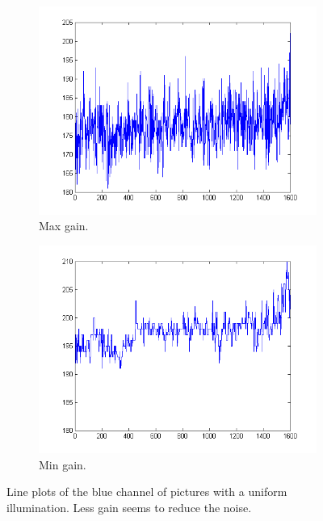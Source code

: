 \documentclass[a4paper, 12pt]{paper}
\begin{document}
\begin{figure}[H]
    \centering
    \begin{subfigure}[b]{0.45\textwidth}
        \includegraphics[width=\textwidth]{img/plot_max_gain}
        \caption{Max gain.}
    \end{subfigure}
    \begin{subfigure}[b]{0.45\textwidth}
        \includegraphics[width=\textwidth]{img/plot_no_gain}
        \caption{Min gain.}
    \end{subfigure}
    \caption{Line plots of the blue channel of pictures with a uniform illumination. Less gain seems to reduce the noise.}
\label{fig:nearly_sat}
\end{figure}
\end{document}
